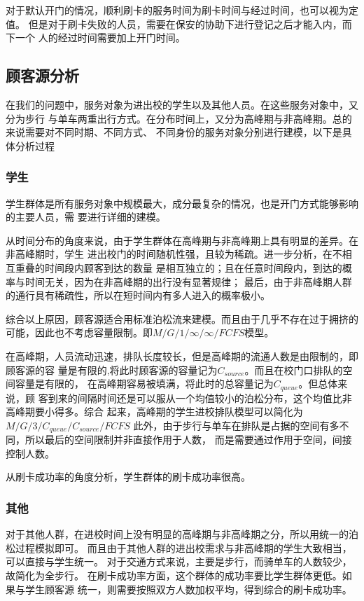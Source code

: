 \documentclass{article}
\begin{document}
    对于默认开门的情况，顺利刷卡的服务时间为刷卡时间与经过时间，也可以视为定值。
    但是对于刷卡失败的人员，需要在保安的协助下进行登记之后才能入内，而下一个
    人的经过时间需要加上开门时间。

\subsection{顾客源分析}
在我们的问题中，服务对象为进出校的学生以及其他人员。在这些服务对象中，又分为步行
与单车两重出行方式。在分布时间上，又分为高峰期与非高峰期。总的来说需要对不同时期、不同方式、
不同身份的服务对象分别进行建模，以下是具体分析过程

\subsubsection{学生}
	学生群体是所有服务对象中规模最大，成分最复杂的情况，也是开门方式能够影响的主要人员，需
    要进行详细的建模。

	从时间分布的角度来说，由于学生群体在高峰期与非高峰期上具有明显的差异。在非高峰期时，学生
    进出校门的时间随机性强，且较为稀疏。进一步分析，在不相互重叠的时间段内顾客到达的数量
    是相互独立的；且在任意时间段内，到达的概率与时间无关，因为在非高峰期的出行没有显著规律；
    最后，由于非高峰期人群的通行具有稀疏性，所以在短时间内有多人进入的概率极小。
    
    综合以上原因，顾客源适合用标准泊松流来建模。而且由于几乎不存在过于拥挤的
    可能，因此也不考虑容量限制。即$M/G/1/\infty/\infty/FCFS$模型。

    在高峰期，人员流动迅速，排队长度较长，但是高峰期的流通人数是由限制的，即顾客源的容
    量是有限的,将此时顾客源的容量记为$C_{source}$。而且在校门口排队的空间容量是有限的，
    在高峰期容易被填满，将此时的总容量记为$C_{queue}$。但总体来说，顾
    客到来的间隔时间还是可以服从一个均值较小的泊松分布，这个均值比非高峰期要小得多。综合
    起来，高峰期的学生进校排队模型可以简化为$M/G/3/C_{queue}/C_{source}/FCFS$
    此外，由于步行与单车在排队是占据的空间有多不同，所以最后的空间限制并非直接作用于人数，
    而是需要通过作用于空间，间接控制人数。

    从刷卡成功率的角度分析，学生群体的刷卡成功率很高。

\subsubsection{其他}
    对于其他人群，在进校时间上没有明显的高峰期与非高峰期之分，所以用统一的泊松过程模拟即可。
    而且由于其他人群的进出校需求与非高峰期的学生大致相当，可以直接与学生统一。
    对于交通方式来说，主要是步行，而骑单车的人数较少，故简化为全步行。
    在刷卡成功率方面，这个群体的成功率要比学生群体更低。如果与学生顾客源
    统一，则需要按照双方人数加权平均，得到综合的刷卡成功率。
\end{document}
